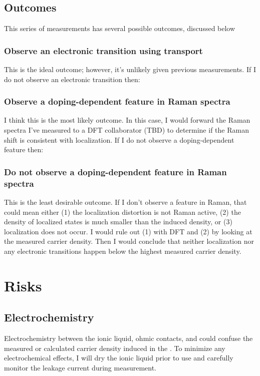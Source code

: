 \documentclass[11pt]{article}
\begin{document}
\begin{multicols}{2}
\subsection{Outcomes}

This series of measurements has several possible outcomes, discussed below

\subsubsection{Observe an electronic transition using transport}
This is the ideal outcome; however, it's unlikely given previous measurements. If I do not observe an electronic transition then:

\subsubsection{Observe a doping-dependent feature in Raman spectra}
I think this is the most likely outcome. In this case, I would forward the Raman spectra I've measured to a DFT collaborator (TBD) to determine if the Raman shift is consistent with localization. If I do not observe a doping-dependent feature then:

\subsubsection{Do not observe a doping-dependent feature in Raman spectra}
This is the least desirable outcome. If I don't observe a feature in Raman, that could mean either (1) the localization distortion is not Raman active, (2) the density of localized states is much smaller than the induced density, or (3) localization does not occur. I would rule out (1) with DFT and (2) by looking at the measured carrier density. Then I would conclude that neither localization nor any electronic transitions happen below the highest measured carrier density.

\section{Risks}

\subsection{Electrochemistry}
Electrochemistry between the ionic liquid, ohmic contacts, and \rucl could confuse the measured or calculated carrier density induced in the \ruclnospace. To minimize any electrochemical effects, I will dry the ionic liquid prior to use and carefully monitor the leakage current during measurement.


\end{multicols}
\end{document}
